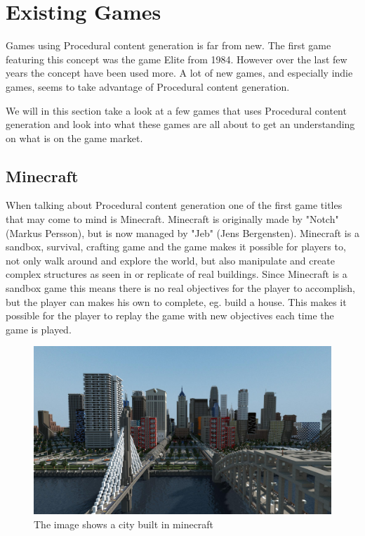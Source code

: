 \section{Existing Games}

Games using Procedural content generation is far from new. The first game featuring this concept was the game Elite from 1984\cite{firstpcg}. However over the last few years the concept have been used more. A lot of new games, and especially indie games, seems to take advantage of Procedural content generation.

We will in this section take a look at a few games that uses Procedural content generation and look into what these games are all about to get an understanding on what is on the game market.


\subsection{Minecraft}

When talking about Procedural content generation one of the first game titles that may come to mind is Minecraft. Minecraft is originally made by "Notch" (Markus Persson), but is now managed by "Jeb" (Jens Bergensten)\cite{Minecraft}. Minecraft is a sandbox, survival, crafting game and the game makes it possible for players to, not only walk around and explore the world, but also manipulate and create complex structures as seen in  or replicate of real buildings. Since Minecraft is a sandbox game this means there is no real objectives for the player to accomplish, but the player can makes his own to complete, eg. build a house. This makes it possible for the player to replay the game with new objectives each time the game is played.

\begin{figure}[H]
	\includegraphics[width=0.7\linewidth]{img/MinecraftCity}
	\centering
	\caption{The image shows a city built in minecraft}
	\label{fig:MinecraftCity}
\end{figure}


